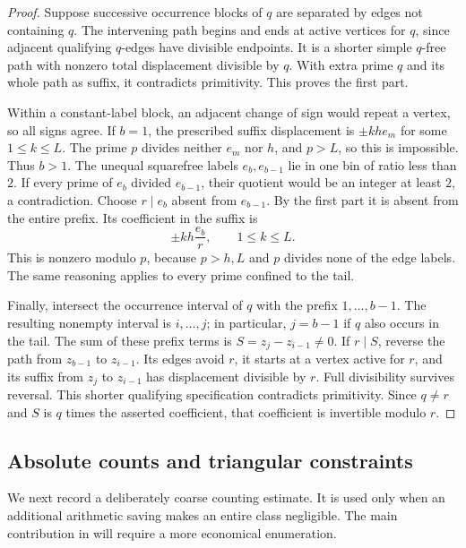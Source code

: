 \begin{proof}
Suppose successive occurrence blocks of $q$ are separated by edges
not containing $q$.  The intervening path begins and ends at active
vertices for $q$, since adjacent qualifying $q$-edges have divisible
endpoints.  It is a shorter simple $q$-free path with nonzero total
displacement divisible by $q$.  With extra prime $q$ and its whole
path as suffix, it contradicts primitivity.  This proves the first
part.

Within a constant-label block, an adjacent change of sign would
repeat a vertex, so all signs agree.  If $b=1$, the prescribed suffix
displacement is $\pm khe_m$ for some $1\le k\le L$.  The prime $p$
divides neither $e_m$ nor $h$, and $p>L$, so this is impossible.
Thus $b>1$.  The unequal squarefree labels $e_b,e_{b-1}$ lie in one
bin of ratio less than $2$.  If every prime of $e_b$ divided
$e_{b-1}$, their quotient would be an integer at least $2$, a
contradiction.  Choose $r\mid e_b$ absent from $e_{b-1}$.  By the
first part it is absent from the entire prefix.  Its coefficient in
the suffix is
\[
 \pm kh\frac{e_b}{r},\qquad 1\le k\le L.
\]
This is nonzero modulo $p$, because $p>h,L$ and $p$ divides none of
the edge labels.  The same reasoning applies to every prime confined
to the tail.

Finally, intersect the occurrence interval of $q$ with the prefix
$1,\ldots,b-1$.  The resulting nonempty interval is $i,\ldots,j$;
in particular, $j=b-1$ if $q$ also occurs in the tail.  The sum of
these prefix terms is $S=z_j-z_{i-1}\ne0$.  If $r\mid S$, reverse the path from
$z_{b-1}$ to $z_{i-1}$.  Its edges avoid $r$, it starts at a vertex
active for $r$, and its suffix from $z_j$ to $z_{i-1}$ has
displacement divisible by $r$.  Full divisibility survives reversal.
This shorter qualifying specification contradicts primitivity.
Since $q\ne r$ and $S$ is $q$ times the asserted coefficient, that
coefficient is invertible modulo $r$.
\end{proof}

\subsection{Absolute counts and triangular constraints}

We next record a deliberately coarse counting estimate.  It is used
only when an additional arithmetic saving makes an entire class
negligible.  The main contribution in  will
require a more economical enumeration.

